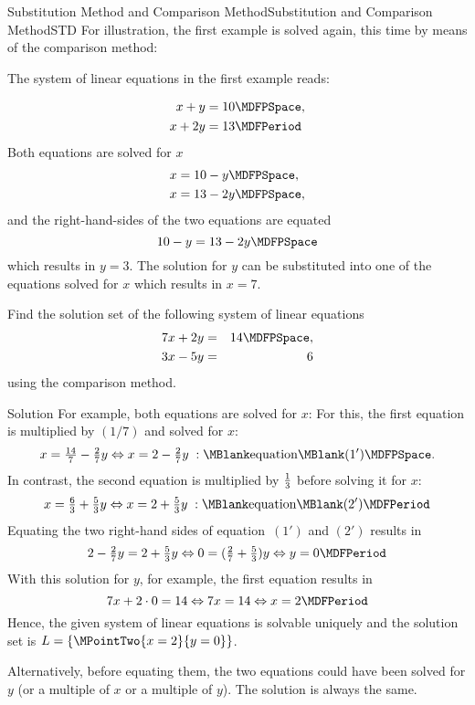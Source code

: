 \begin{MXContent}{Substitution Method and Comparison Method}{Substitution and Comparison Method}{STD}
For illustration, the first example is solved again, this time by means of
the comparison method:

\begin{MExample}
The system of linear equations in the first example reads: 

\begin{eqnarray*}
x + y & =  10 \MDFPSpace, \\ x + 2 y & =  13\MDFPeriod 
\end{eqnarray*}
Both equations are solved for $x$
\begin{eqnarray*}
x & =  10 - y\MDFPSpace,  \\ x & =  13 - 2y \MDFPSpace,
\end{eqnarray*}
and the right-hand-sides of the two equations are equated
$$10 - y = 13 - 2y \MDFPSpace$$
which results in $y = 3$. The solution for $y$ can be substituted into one of
the equations solved for $x$ which results in $x = 7$.

\end{MExample}
\begin{MExercise}
Find the solution set of the following system of linear equations
\begin{eqnarray*}
7 x + 2 y &= & 14 \MDFPSpace, \\ 3 x - 5 y & = & 6
\end{eqnarray*}
using the comparison method.
\ \\
\begin{MHint}{Solution}
For example, both equations are solved for $x$: For this, the first equation is multiplied
by $(1/7)$ and solved for $x$:
$$x = \Mtfrac{14}{7} - \Mtfrac27 y \Leftrightarrow x = 2 - \Mtfrac27 y \; : \MBlank\mbox{equation}\MBlank (1') \MDFPSpace .$$
In contrast, the second equation is multiplied by $\tfrac{1}{3}$ before solving it
for $x$:
$$x = \Mtfrac63 + \Mtfrac53 y \Leftrightarrow x = 2 + \Mtfrac53 y \; : \MBlank\mbox{equation}\MBlank (2') \MDFPeriod $$
Equating the two right-hand sides of equation~$(1')$ and $(2')$ results in
$$2 - \Mtfrac27 y = 2 + \Mtfrac53 y \Leftrightarrow 0 = (\Mtfrac27 + \Mtfrac53) y \Leftrightarrow y = 0 \MDFPeriod $$
With this solution for $y$, for example, the first equation results in
$$7 x + 2 \cdot 0 = 14 \Leftrightarrow 7 x = 14 \Leftrightarrow x = 2 \MDFPeriod $$
Hence, the given system of linear equations is solvable uniquely and the 
solution set is  ${\ML} = \{ \MPointTwo{x = 2}{y = 0} \}$.

Alternatively, before equating them, the two equations could have been solved for $y$ 
(or a multiple of $x$ or a multiple of $y$). The solution is always the same.
\end{MHint}
\end{MExercise}
\end{MXContent}

